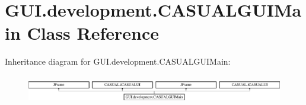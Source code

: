 \hypertarget{class_g_u_i_1_1development_1_1_c_a_s_u_a_l_g_u_i_main}{\section{G\-U\-I.\-development.\-C\-A\-S\-U\-A\-L\-G\-U\-I\-Main Class Reference}
\label{class_g_u_i_1_1development_1_1_c_a_s_u_a_l_g_u_i_main}
}
Inheritance diagram for G\-U\-I.\-development.\-C\-A\-S\-U\-A\-L\-G\-U\-I\-Main\-:\begin{figure}[H]
\begin{center}
\leavevmode
\includegraphics[height=1.290323cm]{class_g_u_i_1_1development_1_1_c_a_s_u_a_l_g_u_i_main}
\end{center}
\end{figure}
